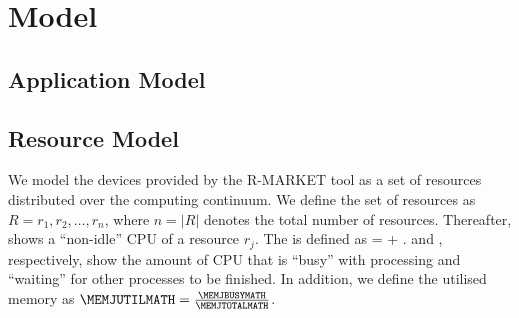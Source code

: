 \chapter{Model} %
\label{ch:model-methodology}

    \section{Application Model}
    \label{sec:application-model}






    \section{Resource Model}
    \label{sec:resource-model}

        We model the devices provided by the R-MARKET tool as a set of resources distributed over the computing continuum. 
        We define the set of resources as $R = {r_1, r_2, \dots, r_n}$, where $n = | R |$ denotes the total number of resources. 
        Thereafter, \CPUJUTIL shows a “non-idle” CPU of a resource $r_j$. 
        The \CPUJUTIL  is defined as \CPUJUTIL  = \CPUJBUSY  + \CPUJWAIT. \CPUJBUSY  and  \CPUJWAIT, respectively, show the amount of CPU that is “busy” with processing and “waiting” for other processes to be finished. In addition, we define the utilised memory as $\MEMJUTILMATH = \frac{\MEMJBUSYMATH}{\MEMJTOTALMATH}$.


